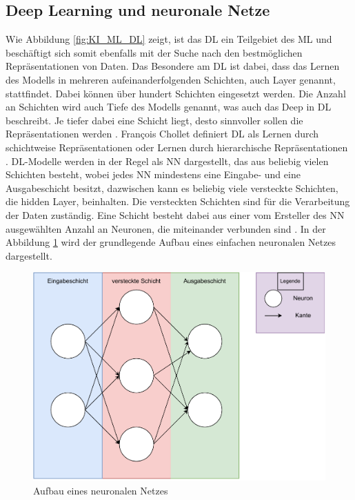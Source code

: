 \subsection{Deep Learning und neuronale Netze}
Wie Abbildung \ref*{fig:KI_ML_DL} zeigt, ist das \ac{DL} ein Teilgebiet des \ac{ML} und beschäftigt sich somit ebenfalls mit der Suche nach den bestmöglichen Repräsentationen von
Daten. Das Besondere am \ac{DL} ist dabei, dass das Lernen des Modells in mehreren aufeinanderfolgenden Schichten, auch Layer genannt, stattfindet. Dabei können
über hundert Schichten eingesetzt werden. Die Anzahl an Schichten wird auch Tiefe des Modells genannt, was auch das \glqq Deep\grqq{} in \ac{DL} beschreibt. Je tiefer dabei eine Schicht liegt,
desto sinnvoller sollen die Repräsentationen werden \cite[vgl. S.27]{DL_PY}. François Chollet definiert \ac{DL} als \glqq Lernen durch schichtweise Repräsentationen oder 
Lernen durch hierarchische Repräsentationen\grqq{} \cite[S.27]{DL_PY}. \ac{DL}-Modelle werden in der Regel als \ac{NN} dargestellt, das aus beliebig vielen Schichten besteht, wobei
jedes \ac{NN} mindestens eine Eingabe- und eine Ausgabeschicht  besitzt, dazwischen kann es beliebig viele versteckte Schichten, die hidden Layer, beinhalten. 
Die versteckten Schichten sind für die Verarbeitung der Daten zuständig. Eine Schicht besteht dabei aus einer vom Ersteller des \ac{NN} ausgewählten Anzahl an Neuronen, die miteinander 
verbunden sind \cite[vgl. S.26]{NN}. In der Abbildung \ref*{fig:NN_Modell} wird der grundlegende Aufbau eines einfachen neuronalen Netzes dargestellt. 

\begin{figure}[H]
    \centering
    \includegraphics[scale=0.7]{abbildungen/NN_Modell.pdf}
    \caption{Aufbau eines neuronalen Netzes \cite[S.27]{NN}}
    \label{fig:NN_Modell}
\end{figure}

